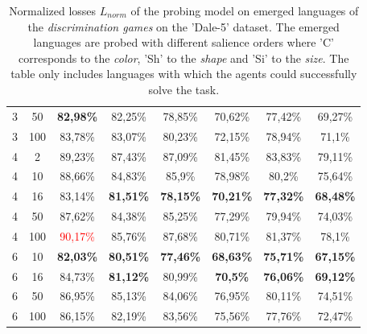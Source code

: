 \begin{table}[ht]
\begin{tabular}{cc|c|c|c|c|c|c}
        {3} & {50}  & \textbf{82,98\%}         & {82,25\%}                & {78,85\%}                & {70,62\%}                & {77,42\%}            & {69,27\%}            \\
        {3} & {100} & {83,78\%}                & {83,07\%}                & {80,23\%}                & {72,15\%}                & {78,94\%}            & {71,1\%}             \\
        {4} & {2}   & {89,23\%}                & {87,43\%}                & {87,09\%}                & {81,45\%}                & {83,83\%}            & {79,11\%}            \\
        {4} & {10}  & {88,66\%}                & {84,83\%}                & {85,9\%}                 & {78,98\%}                & {80,2\%}             & {75,64\%}            \\
        {4} & {16}  & {83,14\%}                & \textbf{81,51\%}         & \textbf{78,15\%}         & \textbf{70,21\%}         & \textbf{77,32\%}     & \textbf{68,48\%}     \\
        {4} & {50}  & {87,62\%}                & {84,38\%}                & {85,25\%}                & {77,29\%}                & {79,94\%}            & {74,03\%}            \\
        {4} & {100} & \textcolor{red}{90,17\%} & {85,76\%}                & {87,68\%}                & {80,71\%}                & {81,37\%}            & {78,1\%}             \\
        {6} & {10}  & \textbf{82,03\%}         & \textbf{80,51\%}         & \textbf{77,46\%}         & \textbf{68,63\%}         & \textbf{75,71\%}     & \textbf{67,15\%}     \\
        {6} & {16}  & {84,73\%}                & \textbf{81,12\%}         & {80,99\%}                & \textbf{70,5\%}          & \textbf{76,06\%}     & \textbf{69,12\%}     \\
        {6} & {50}  & {86,95\%}                & {85,13\%}                & {84,06\%}                & {76,95\%}                & {80,11\%}            & {74,51\%}            \\
        {6} & {100} & {86,15\%}                & {82,19\%}                & {83,56\%}                & {75,56\%}                & {77,76\%}            & {72,47\%}            \\
        \bottomrule
    \end{tabular}
    \caption{Normalized losses $L_{norm}$ of the probing model on emerged languages of the \emph{discrimination games} on the 'Dale-5' dataset. The emerged languages are probed with different salience orders where 'C' corresponds to the \emph{color}, 'Sh' to the \emph{shape} and 'Si' to the \emph{size}. The table only includes languages with which the agents could successfully solve the task.}
    \label{tab:probing:discriminator:dale-5}
\end{table}

